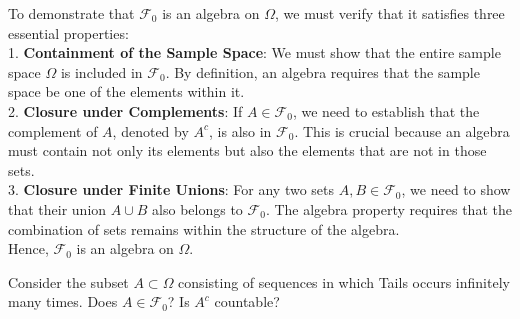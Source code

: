 \begin{solution}
    To demonstrate that \(\mathcal{F}_0\) is an algebra on \(\Omega\), we must verify that it satisfies three essential properties:\\

    1. \textbf{Containment of the Sample Space}: We must show that the entire sample space \(\Omega\) is included in \(\mathcal{F}_0\). By definition, an algebra requires that the sample space be one of the elements within it.\\

    2. \textbf{Closure under Complements}: If \(A \in \mathcal{F}_0\), we need to establish that the complement of \(A\), denoted by \(A^c\), is also in \(\mathcal{F}_0\). This is crucial because an algebra must contain not only its elements but also the elements that are not in those sets.\\

    3. \textbf{Closure under Finite Unions}: For any two sets \(A, B \in \mathcal{F}_0\), we need to show that their union \(A \cup B\) also belongs to \(\mathcal{F}_0\). The algebra property requires that the combination of sets remains within the structure of the algebra.\\

    Hence, \(\mathcal{F}_0\) is an algebra on \(\Omega\).\\
\end{solution}

\begin{exercise}
    Consider the subset \( A \subset \Omega \) consisting of sequences in which Tails occurs infinitely many times. Does \( A \in \mathcal{F}_0 \)? Is \( A^c \) countable?
\end{exercise}

